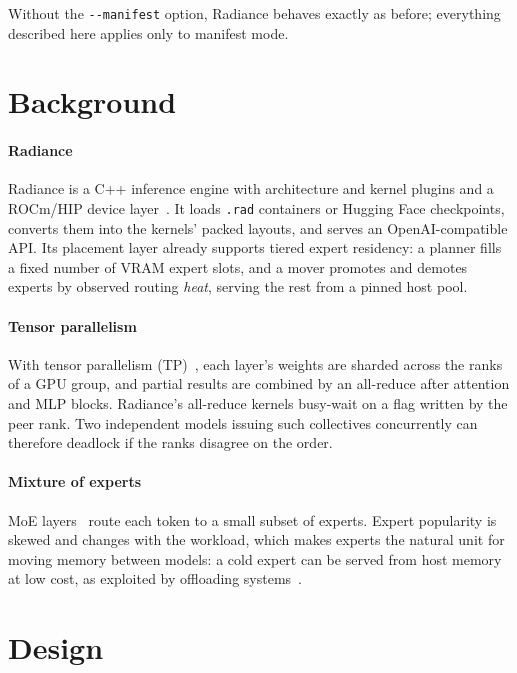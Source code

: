 \documentclass[10pt,conference,a4paper]{IEEEtran}
\newcommand{\code}[1]{\texttt{#1}}
\begin{document}
Without the \code{-{}-manifest} option, Radiance behaves exactly as before; everything described
here applies only to manifest mode.

\section{Background}

\paragraph{Radiance} Radiance is a C++ inference engine with architecture and kernel plugins and a
ROCm/HIP device layer~\cite{radiance}. It loads \code{.rad} containers or Hugging Face checkpoints,
converts them into the kernels' packed layouts, and serves an OpenAI-compatible API. Its placement
layer already supports tiered expert residency: a planner fills a fixed number of VRAM expert slots,
and a mover promotes and demotes experts by observed routing \emph{heat}, serving the rest from a
pinned host pool.

\paragraph{Tensor parallelism} With tensor parallelism (TP)~\cite{megatron}, each layer's weights
are sharded across the ranks of a GPU group, and partial results are combined by an all-reduce after
attention and MLP blocks. Radiance's all-reduce kernels busy-wait on a flag written by the peer
rank. Two independent models issuing such collectives concurrently can therefore deadlock if the
ranks disagree on the order.

\paragraph{Mixture of experts} MoE layers~\cite{shazeer2017,fedus2022} route each token to a small
subset of experts. Expert popularity is skewed and changes with the workload, which makes experts
the natural unit for moving memory between models: a cold expert can be served from host memory at
low cost, as exploited by offloading systems~\cite{eliseev2023,flexgen,dsinference}.

\section{Design}\label{sec:design}
\end{document}
